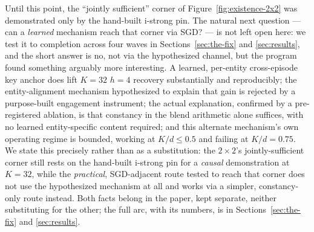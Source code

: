 Until this point, the ``jointly sufficient'' corner of
Figure~\ref{fig:existence-2x2} was demonstrated only by the hand-built
i-strong pin. The natural next question --- can a \emph{learned}
mechanism reach that corner via SGD? --- is not left open here: we test
it to completion across four waves in Sections~\ref{sec:the-fix} and
\ref{sec:results}, and the short answer is no, not via the hypothesized
channel, but the program found something arguably more interesting. A
learned, per-entity cross-episode key anchor does lift $K{=}32$ $h{=}4$
recovery substantially and reproducibly; the entity-alignment mechanism
hypothesized to explain that gain is rejected by a purpose-built
engagement instrument; the actual explanation, confirmed by a
pre-registered ablation, is that constancy in the blend arithmetic alone
suffices, with no learned entity-specific content required; and this
alternate mechanism's own operating regime is bounded, working at
$K/d\leq0.5$ and failing at $K/d{=}0.75$. We state this precisely rather
than as a substitution: the $2\times2$'s jointly-sufficient corner still
rests on the hand-built i-strong pin for a \emph{causal} demonstration at
$K{=}32$, while the \emph{practical}, SGD-adjacent route tested to reach
that corner does not use the hypothesized mechanism at all and works via
a simpler, constancy-only route instead. Both facts belong in the paper,
kept separate, neither substituting for the other; the full arc, with its
numbers, is in Sections~\ref{sec:the-fix} and \ref{sec:results}.
